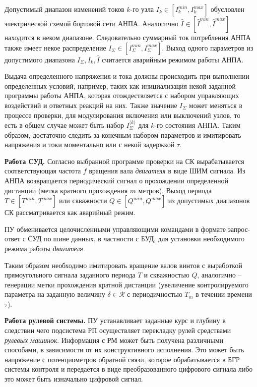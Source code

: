 Допустимый диапазон изменений токов $k$-го узла $I_k \in [I_k^{min}, I_k^{max}]$ обусловлен электрической схемой бортовой сети АНПА.
Аналогично $\hat I \in [\hat I^{min}, \hat I^{max}]$ находится в неком диапазоне.
Следовательно суммарный ток потребления АНПА также имеет некое распределение $I_\Sigma \in [I_\Sigma^{min}, I_\Sigma^{max}]$.
Выход одного параметров из допустимого диапазона $I_\Sigma, I_k, \hat I$ считается аварийным режимом работы АНПА.

Выдача определенного напряжения и тока должны происходить при выполнении определенных условий,
например, таких как инициализация некой заданной программы работы АНПА, которая
отождествляется с набором управляющих воздействий и ответных реакций на них.
Также значение $I_\Sigma$ может меняться в процессе проверки, для модулирования включения или выключений узлов,
то есть в общем случае может быть набор $I_\Sigma^{\langle k \rangle}$ для $k$-го состояния АНПА.
Таким образом, достаточно следить за конечным набором параметров и
имитировать напряжения и токи моментально или с некой задержкой $\tau$.

\textbf{Работа СУД.}
Согласно выбранной программе проверки на СК вырабатывается соответствующая 
частота $f$ вращения вала \textit{двигателя} в виде ШИМ сигнала.
Из АНПА возвращается периодический сигнал о прохождении определенной дистанции (метка кратного прохождения $m$ метров).
Выход периода $T \in [T^{min}, T^{max}]$ или скважности $Q \in [Q^{min}, Q^{max}]$ из допустимых диапазонов
СК рассматривается как аварийный режим.

ПУ обменивается целочисленными управляющими командами в формате запрос-ответ с СУД по шине данных, в частности с БУД,
для установки необходимого режима работы \textit{двигателя}.

Таким образом необходимо имитировать вращение валов винтов с выработкой прямоугольного сигнала заданного периода $T$ и скважностью $Q$,
аналогично -- генерации метки прохождения кратной дистанции
(увеличение контролируемого параметра на заданную величину $\delta \in \mathcal{R}$ с периодичностью $T_m$ в течении времени $\tau$).

\textbf{Работа рулевой системы.}
ПУ устанавливает заданные курс и глубину в следствии чего подсистема РП
осуществляет перекладку рулей средствами \textit{рулевых машинок}.
Информация с РМ может быть получена различными способами, в зависимости от их конструктивного исполнения.
Это может быть напряжение с потенциометров обратной связи, которое обрабатывается в БГР системы контроля
и передается в виде преобразованного цифрового сигнала
либо это может быть изначально  цифровой сигнал.

